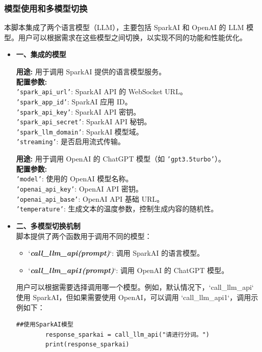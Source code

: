 \documentclass[12pt,hyperref,a4paper,UTF8]{ctexart}
\begin{document}
\subsubsection{模型使用和多模型切换}
本脚本集成了两个语言模型（LLM），主要包括 SparkAI 和 OpenAI 的 LLM 模型。用户可以根据需求在这些模型之间切换，以实现不同的功能和性能优化。
\begin{itemize}
    \item \textbf{一、集成的模型}
    \begin{tcolorbox}[title=SparkAI (\texttt{‘ChatSparkLLM’})]
        \textbf{用途:} 用于调用 SparkAI 提供的语言模型服务。\\
        \textbf{配置参数:} \\
        \texttt{'spark\_api\_url'}: SparkAI API 的 WebSocket URL。\\
        \texttt{'spark\_app\_id'}: SparkAI 应用 ID。\\
        \texttt{'spark\_api\_key'}: SparkAI API 密钥。\\
        \texttt{'spark\_api\_secret'}: SparkAI API 秘钥。\\
        \texttt{'spark\_llm\_domain'}: SparkAI 模型域。\\
        \texttt{'streaming'}: 是否启用流式传输。
    \end{tcolorbox}
    \begin{tcolorbox}[title=OpenAI (\texttt{‘ChatOpenAI’})]
        \textbf{用途:} 用于调用 OpenAI 的 ChatGPT 模型（如 \texttt{'gpt3.5turbo'}）。\\
        \textbf{配置参数:} \\
        \texttt{'model'}: 使用的 OpenAI 模型名称。\\
        \texttt{'openai\_api\_key'}: OpenAI API 密钥。\\
        \texttt{'openai\_api\_base'}: OpenAI API 基础 URL。\\
        \texttt{'temperature'}: 生成文本的温度参数，控制生成内容的随机性。
    \end{tcolorbox}
    \item \textbf{二、多模型切换机制}\\
        脚本提供了两个函数用于调用不同的模型：\\
        \begin{itemize}
            \item `\textbf{\textit{call\_llm\_api(prompt)}}`: 调用 SparkAI 的语言模型。\\
            \item`\textbf{\textit{call\_llm\_api1(prompt)}}`: 调用 OpenAI 的 ChatGPT 模型。\\
        \end{itemize}
        用户可以根据需要选择调用哪一个模型。例如，默认情况下，`call\_llm\_api` 使用 SparkAI，但如果需要使用 OpenAI，可以调用 `call\_llm\_api1`，调用示例如下：
        \begin{lstlisting}[caption={使用示例代码}, label={lst3}]
        ##使用SparkAI模型
        response_sparkai = call_llm_api("请进行分词。")
        print(response_sparkai)


\end{lstlisting}
\end{itemize}
\end{document}
